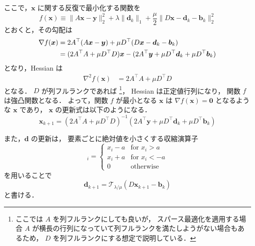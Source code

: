 ここで，$\bm{x}$ に関する反復で最小化する関数を
\begin{equation}
    f(\bm{x}) \equiv \|A \bm{x} - \bm{y}\|_2^2 + \lambda \|\bm{d}_k\|_1
    + \frac{\mu}{2} \|D \bm{x} - \bm{d}_k - \bm{b}_k\|_2^2
\end{equation}
とおくと，その勾配は
\begin{align}
    \nabla f(\bm{x})
     & =
    2 A^\top (A \bm{x} - \bm{y}) + \mu D^\top (D \bm{x} - \bm{d}_k - \bm{b}_k)
    \notag \\
     & =
    (2 A^\top A + \mu D^\top D) \bm{x}
    - (2 A^\top \bm{y} + \mu D^\top \bm{d}_k + \mu D^\top \bm{b}_k)
\end{align}
となり，Hessian は
\begin{align}
    \nabla^2 f(\bm{x})
     & =
    2 A^\top A + \mu D^\top D
\end{align}
となる．
$D$ が列フルランクであれば
\footnote{ここでは $A$ を列フルランクにしても良いが，%
    スパース最適化を適用する場合 $A$ が横長の行列になっていて列フルランクを満たしようがない場合もあるため，%
    $D$ を列フルランクにする想定で説明している．}，
Hessian は正定値行列になり，
関数 $f$ は強凸関数となる．
よって，関数 $f$ が最小となる $\bm{x}$ は $\nabla f(\bm{x}) = \bm{0}$ となるような $\bm{x}$ であり，
$\bm{x}$ の更新式は以下のようになる．
\begin{equation}
    \bm{x}_{k+1} =
    (2 A^\top A + \mu D^\top D)^{-1}
    (2 A^\top \bm{y} + \mu D^\top \bm{d}_k + \mu D^\top \bm{b}_k)
\end{equation}

また，$\bm{d}$ の更新は，
要素ごとに絶対値を小さくする収縮演算子
\begin{equation}
    [\mathcal{T}_a(\bm{x})]_i =
    \begin{cases}
        x_i - a & \text{for $x_i > a$}  \\
        x_i + a & \text{for $x_i < -a$} \\
        0       & \text{otherwise}
    \end{cases}
\end{equation}
を用いることで
\begin{equation}
    \bm{d}_{k+1} = \mathcal{T}_{\lambda / \mu} (D\bm{x}_{k+1} - \bm{b}_k)
\end{equation}
と書ける．

